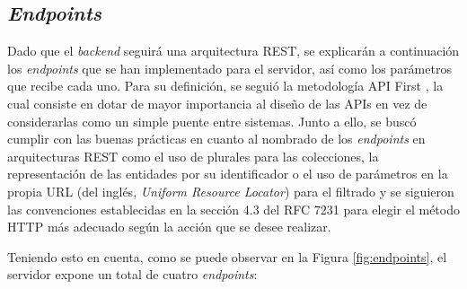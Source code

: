 \subsection{\textit{Endpoints}}

Dado que el \textit{backend} seguirá una arquitectura REST, se explicarán a continuación los \textit{endpoints} que se han implementado para el servidor, así como los parámetros
que recibe cada uno. Para su definición, se seguió la metodología API First \cite{apifirst}, la cual consiste en dotar de mayor importancia al diseño de las APIs en vez de
considerarlas como un simple puente entre sistemas. Junto a ello, se buscó cumplir con las buenas prácticas en cuanto al nombrado de los \textit{endpoints} en arquitecturas REST como el
uso de plurales para las colecciones, la representación de las entidades por su identificador o el uso de parámetros en la propia URL (del inglés, \textit{Uniform Resource Locator})
para el filtrado y se siguieron las convenciones establecidas
en la sección 4.3 del RFC 7231 \cite{rfc7231} para elegir el método HTTP más adecuado según la acción que se desee realizar.

\bigskip
Teniendo esto en cuenta, como se puede observar en la Figura \ref{fig:endpoints}, el servidor expone un total de cuatro \textit{endpoints}:

